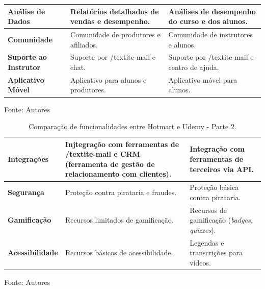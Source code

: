 \begin{apendicesenv}
\begin{table}[h]
\begin{adjustbox}{width=\textwidth}
\begin{tabular}{|p{5cm}|p{5cm}|p{5cm}|}
        \hline
        \textbf{Análise de Dados} & Relatórios detalhados de vendas e desempenho. & Análises de desempenho do curso e dos alunos. \\
        \hline
        \textbf{Comunidade} & Comunidade de produtores e afiliados. & Comunidade de instrutores e alunos. \\
        \hline
        \textbf{Suporte ao Instrutor} & Suporte por /textit{e-mail} e chat. & Suporte por /textit{e-mail} e centro de ajuda. \\
        \hline
        \textbf{Aplicativo Móvel} & Aplicativo para alunos e produtores. & Aplicativo móvel para alunos. \\
        \hline
    \end{tabular}
    \end{adjustbox}

    \vspace{5mm}
    {\footnotesize Fonte: Autores} 

\end{table}

\begin{table}[h]
    \centering
    \caption{Comparação de funcionalidades entre Hotmart e Udemy - Parte 2.}
    \label{tab:comparacao_hotmart_udemy2}
    \begin{adjustbox}{width=\textwidth}
    \begin{tabular}{|p{5cm}|p{5cm}|p{5cm}|}
\hline
\textbf{Integrações} & Injtegração com ferramentas de /textit{e-mail} e CRM (ferramenta de gestão de relacionamento com clientes). & Integração com ferramentas de terceiros via API. \\
\hline
\textbf{Segurança} & Proteção contra pirataria e fraudes. & Proteção básica contra pirataria. \\
\hline
\textbf{Gamificação} & Recursos limitados de gamificação. & Recursos de gamificação (\textit{badges, quizzes}). \\
\hline
\textbf{Acessibilidade} & Recursos básicos de acessibilidade. & Legendas e transcrições para vídeos. \\
\hline
\end{tabular}
\end{adjustbox}

\vspace{5mm}
{\footnotesize Fonte: Autores} 

\end{table}



\end{apendicesenv}
